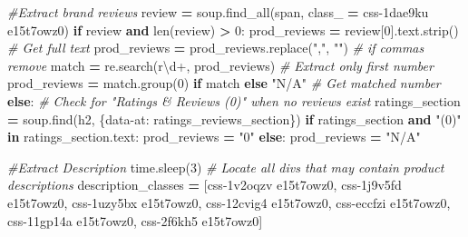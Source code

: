 \documentclass[
]{article}
\newenvironment{Shaded}{\begin{snugshade}}{\end{snugshade}}
\newcommand{\BuiltInTok}[1]{#1}
\newcommand{\CommentTok}[1]{\textcolor[rgb]{0.56,0.35,0.01}{\textit{#1}}}
\newcommand{\ControlFlowTok}[1]{\textcolor[rgb]{0.13,0.29,0.53}{\textbf{#1}}}
\newcommand{\DecValTok}[1]{\textcolor[rgb]{0.00,0.00,0.81}{#1}}
\newcommand{\KeywordTok}[1]{\textcolor[rgb]{0.13,0.29,0.53}{\textbf{#1}}}
\newcommand{\NormalTok}[1]{#1}
\newcommand{\OperatorTok}[1]{\textcolor[rgb]{0.81,0.36,0.00}{\textbf{#1}}}
\newcommand{\StringTok}[1]{\textcolor[rgb]{0.31,0.60,0.02}{#1}}
\newcommand{\VerbatimStringTok}[1]{\textcolor[rgb]{0.31,0.60,0.02}{#1}}
\begin{document}
\begin{Shaded}
\begin{Highlighting}[]
        \CommentTok{\#Extract brand reviews}
\NormalTok{        review }\OperatorTok{=}\NormalTok{ soup.find\_all(}\StringTok{\textquotesingle{}span\textquotesingle{}}\NormalTok{, class\_ }\OperatorTok{=} \StringTok{\textquotesingle{}css{-}1dae9ku e15t7owz0\textquotesingle{}}\NormalTok{)}
        \ControlFlowTok{if}\NormalTok{ review }\KeywordTok{and} \BuiltInTok{len}\NormalTok{(review) }\OperatorTok{\textgreater{}} \DecValTok{0}\NormalTok{:}
\NormalTok{          prod\_reviews }\OperatorTok{=}\NormalTok{ review[}\DecValTok{0}\NormalTok{].text.strip()  }\CommentTok{\# Get full text}
\NormalTok{          prod\_reviews }\OperatorTok{=}\NormalTok{ prod\_reviews.replace(}\StringTok{","}\NormalTok{, }\StringTok{""}\NormalTok{)  }\CommentTok{\# if commas remove}
\NormalTok{          match }\OperatorTok{=}\NormalTok{ re.search(}\VerbatimStringTok{r\textquotesingle{}\textbackslash{}d+\textquotesingle{}}\NormalTok{, prod\_reviews)  }\CommentTok{\# Extract only first number}
\NormalTok{          prod\_reviews }\OperatorTok{=}\NormalTok{ match.group(}\DecValTok{0}\NormalTok{) }\ControlFlowTok{if}\NormalTok{ match }\ControlFlowTok{else} \StringTok{"N/A"}  \CommentTok{\# Get matched number}
        \ControlFlowTok{else}\NormalTok{:}
          \CommentTok{\# Check for "Ratings \& Reviews (0)" when no reviews exist}
\NormalTok{          ratings\_section }\OperatorTok{=}\NormalTok{ soup.find(}\StringTok{\textquotesingle{}h2\textquotesingle{}}\NormalTok{, \{}\StringTok{\textquotesingle{}data{-}at\textquotesingle{}}\NormalTok{: }
                                  \StringTok{\textquotesingle{}ratings\_reviews\_section\textquotesingle{}}\NormalTok{\})}
          \ControlFlowTok{if}\NormalTok{ ratings\_section }\KeywordTok{and} \StringTok{"(0)"} \KeywordTok{in}\NormalTok{ ratings\_section.text:}
\NormalTok{            prod\_reviews }\OperatorTok{=} \StringTok{"0"}
          \ControlFlowTok{else}\NormalTok{:}
\NormalTok{            prod\_reviews }\OperatorTok{=} \StringTok{"N/A"}

        \CommentTok{\#Extract Description}
\NormalTok{        time.sleep(}\DecValTok{3}\NormalTok{)}
        \CommentTok{\# Locate all divs that may contain product descriptions}
\NormalTok{        description\_classes }\OperatorTok{=}\NormalTok{ [}\StringTok{\textquotesingle{}css{-}1v2oqzv e15t7owz0\textquotesingle{}}\NormalTok{, }
                              \StringTok{\textquotesingle{}css{-}1j9v5fd e15t7owz0\textquotesingle{}}\NormalTok{, }
                              \StringTok{\textquotesingle{}css{-}1uzy5bx e15t7owz0\textquotesingle{}}\NormalTok{, }
                              \StringTok{\textquotesingle{}css{-}12cvig4 e15t7owz0\textquotesingle{}}\NormalTok{, }
                              \StringTok{\textquotesingle{}css{-}eccfzi e15t7owz0\textquotesingle{}}\NormalTok{, }
                              \StringTok{\textquotesingle{}css{-}11gp14a e15t7owz0\textquotesingle{}}\NormalTok{, }
                              \StringTok{\textquotesingle{}css{-}2f6kh5 e15t7owz0\textquotesingle{}}\NormalTok{]}


\end{Highlighting}
\end{Shaded}
\end{document}
